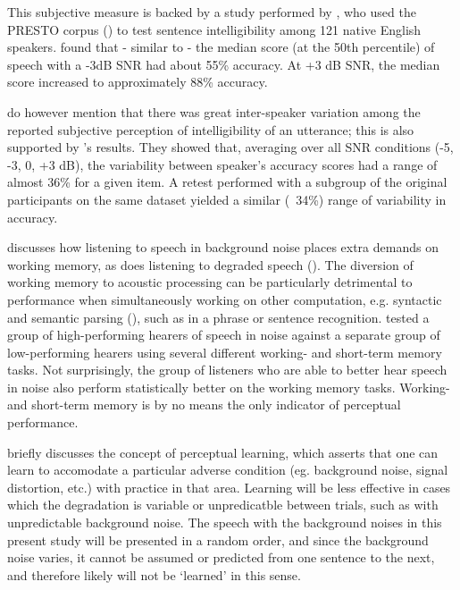 \documentclass[dissertation,copyright]{uathesis}
\begin{document}
This subjective measure is backed by a study performed by \cite{gilbert:13}, who used the PRESTO corpus (\cite{garofolo:93}) to test sentence intelligibility among 121 native English speakers.  \cite{gilbert:13} found that - similar to \cite{ding:13} - the median score (at the 50th percentile) of speech with a -3dB SNR had about 55\% accuracy.  At +3 dB SNR, the median score increased to approximately 88\% accuracy.

\cite{ding:13} do however mention that there was great inter-speaker variation among the reported subjective perception of intelligibility of an utterance; this is also supported by \cite{gilbert:13}'s results. They showed that, averaging over all SNR conditions (-5, -3, 0, +3 dB), the variability between speaker's accuracy scores had a range of almost 36\% for a given item.  A retest performed with a subgroup of the original participants on the same dataset yielded a similar (~34\%) range of variability in accuracy.  

\cite{francis:10} discusses how listening to speech in background noise places extra demands on working memory, as does listening to degraded speech (\cite{francis:09}).  The diversion of working memory to acoustic processing can be particularly detrimental to performance when simultaneously working on other computation, e.g. syntactic and semantic parsing (\cite{caplan:99}), such as in a phrase or sentence recognition. \cite{tamati:13} tested a group of high-performing hearers of speech in noise against a separate group of low-performing hearers using several different working- and short-term memory tasks.  Not surprisingly, the group of listeners who are able to better hear speech in noise also perform statistically better on the working memory tasks.  Working- and short-term memory is by no means the only indicator of perceptual performance.

\cite{mattys:12} briefly discusses the concept of perceptual learning, which asserts that one can learn to accomodate a particular adverse condition (eg. background noise, signal distortion, etc.) with practice in that area.  Learning will be less effective in cases which the degradation is variable or unpredicatble between trials, such as with unpredictable background noise.  The speech with the background noises in this present study will be presented in a random order, and since the background noise varies, it cannot be assumed or predicted from one sentence to the next, and therefore likely will not be `learned' in this sense.
\end{document}
